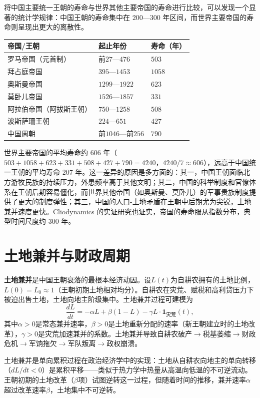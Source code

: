 \begin{remark}[中国王朝与世界帝国的寿命比较]\label{rem:dynasty_vs_empires}
将中国主要统一王朝的寿命与世界其他主要帝国的寿命进行比较，可以发现一个显著的统计学规律：中国王朝的寿命集中在 $200$—$300$ 年区间，而世界主要帝国的寿命则呈现出更大的离散性。

\begin{center}
\begin{tabular}{>{\centering\arraybackslash}p{3.5cm}>{\centering\arraybackslash}p{2.5cm}>{\centering\arraybackslash}p{2cm}}
\toprule
帝国/王朝 & 起止年份 & 寿命（年） \\
\midrule
罗马帝国（元首制） & 前$27$—$476$ & $503$ \\
拜占庭帝国 & $395$—$1453$ & $1058$ \\
奥斯曼帝国 & $1299$—$1922$ & $623$ \\
莫卧儿帝国 & $1526$—$1857$ & $331$ \\
阿拉伯帝国（阿拔斯王朝） & $750$—$1258$ & $508$ \\
波斯萨珊王朝 & $224$—$651$ & $427$ \\
中国周朝 & 前$1046$—前$256$ & $790$ \\
\bottomrule
\end{tabular}
\end{center}

世界主要帝国的平均寿命约 $606$ 年（$503+1058+623+331+508+427+790=4240$，$4240/7\approx606$），远高于中国统一王朝的平均寿命 $207$ 年。这一差异的原因是多方面的：其一，中国王朝面临北方游牧民族的持续压力，外患频率高于其他文明；其二，中国的科举制度和官僚体系在王朝后期容易僵化，而世界其他帝国（如奥斯曼、莫卧儿）的军事贵族制度提供了更大的制度弹性；其三，中国的人口-土地矛盾在王朝中后期尤为尖锐，土地兼并速度更快。Cliodynamics 的实证研究也证实，帝国的寿命服从指数分布，典型时间尺度约 $300$ 年。
\end{remark}

\section{土地兼并与财政周期}

\begin{definition}[土地兼并的数学描述]\label{def:land_concentration}
\textbf{土地兼并}是中国王朝衰落的最根本经济动因。设$L(t)$为自耕农拥有的土地比例，$L(0) = L_0 \approx 1$（王朝初期土地相对均分）。自耕农在灾荒、赋税和高利贷压力下被迫出售土地，土地向地主阶级集中。土地兼并过程可建模为
\[
\frac{dL}{dt} = -\alpha L + \beta(1-L) - \gamma L \cdot \mathbf{1}_{\text{灾荒}}(t),
\]
其中$\alpha > 0$是常态兼并速率，$\beta > 0$是土地重新分配的速率（新王朝建立时的土地改革），$\gamma > 0$是灾荒加速兼并的系数。土地兼并导致自耕农破产$\to$税基萎缩$\to$财政危机$\to$军饷拖欠$\to$军队叛离$\to$政权崩溃。

土地兼并是单向累积过程在政治经济学中的实现：土地从自耕农向地主的单向转移（$dL/dt < 0$）是累积平移——类似于热力学中热量从高温向低温的不可逆流动。王朝初期的土地改革（$\beta$项）试图逆转这一过程，但随着时间的推移，兼并速率$\alpha$超过改革速率$\beta$，土地集中不可逆转。
\end{definition}


